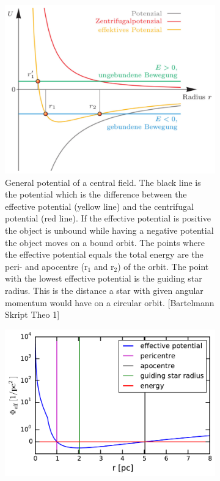 \begin{figure}[htbp]
\centering
	\begin{subfigure}{0.475\textwidth}
	\includegraphics[width=\textwidth]{Plots/eff_potential_bartelmann.png}
	\caption{General potential of a central field. The black line is the potential which is the difference between the effective potential (yellow line) and the centrifugal potential (red line). If the effective potential is positive the object is unbound while having a negative potential the object moves on a bound orbit. The points where the effective potential equals the total energy are the peri- and apocentre (r\(_1\) and r\(_2\)) of the orbit. The point with the lowest effective potential is the guiding star radius. This is the distance a star with given angular momentum would have on a circular orbit. [Bartelmann Skript Theo 1]}
	\label{fig:eff_potential_bartelmann}
	\end{subfigure}
	\hfill
	\begin{subfigure}{0.475\textwidth}
	\includegraphics[width=\textwidth]{Plots/pot_eff_theory_part.pdf}

\end{subfigure}
\end{figure}
